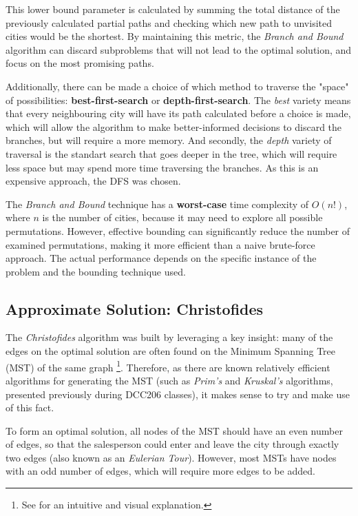 \documentclass[12pt]{article}
\begin{document}
This lower bound parameter is calculated by summing the total distance of the previously calculated partial paths and checking which new path to unvisited cities would be the shortest. By maintaining this metric, the \textit{Branch and Bound} algorithm can discard subproblems that will not lead to the optimal solution, and focus on the most promising paths.

Additionally, there can be made a choice of which method to traverse the "space" of 
possibilities: \textbf{best-first-search} or \textbf{depth-first-search}. The \textit{best} 
variety means that every neighbouring city will have its path calculated before a choice is 
made, which will allow the algorithm to make better-informed decisions to discard the branches, 
but will require a more memory. And secondly, the \textit{depth} variety of traversal is the 
standart search that goes deeper in the tree, which will require less space but may spend more 
time traversing the branches. As this is an expensive approach, the DFS was chosen.

The \textit{Branch and Bound} technique has a \textbf{worst-case} time complexity of $O(n!)$, 
where $n$ is the number of cities, because it may need to explore all possible permutations. 
However, effective bounding can significantly reduce the number of examined permutations, 
making it more efficient than a naive brute-force approach. The actual performance depends on 
the specific instance of the problem and the bounding technique used.

\subsection{Approximate Solution: Christofides} \label{sec:chris_explanation}

The \textit{Christofides} algorithm was built by leveraging a key insight: many of the edges on the 
optimal solution are often found on the Minimum Spanning Tree (MST) of the same graph 
\footnote{See \cite{reducible_explanation} for an intuitive and visual explanation.}. 
Therefore, as there are known relatively efficient algorithms for generating the MST 
(such as \textit{Prim's} and \textit{Kruskal's} algorithms, presented previously during DCC206 classes), 
it makes sense to try and make use of this fact.

To form an optimal solution, all nodes of the MST should have an even number of edges, so 
that the salesperson could enter and leave the city through exactly two edges (also known as an 
\textit{Eulerian Tour}). However, most MSTs have nodes with an odd number of edges, 
which will require more edges to be added.
\end{document}
